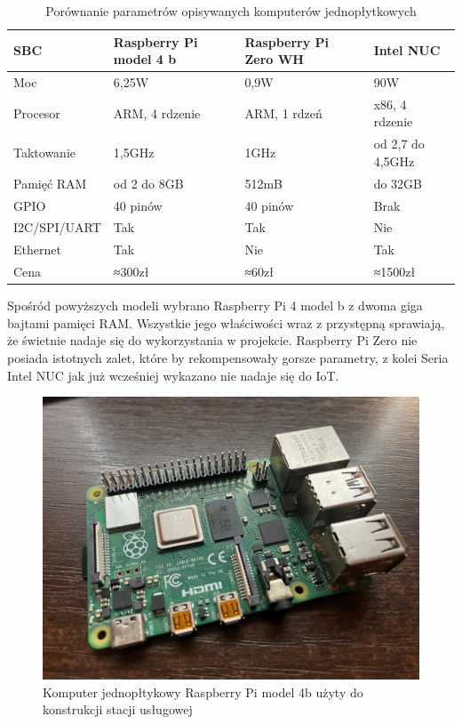 \documentclass[12pt, twoside, openany]{mwrep}
\begin{document}
\begin{table}[H]
\centering
\begin{tabular}{|l|l|l|l|}
\hline
SBC          & Raspberry Pi model 4 b & Raspberry Pi Zero WH & Intel NUC        \\ \hline
Moc          & 6,25W                  & 0,9W                 & 90W              \\ \hline
Procesor     & ARM, 4 rdzenie         & ARM, 1 rdzeń         & x86, 4 rdzenie   \\ \hline
Taktowanie   & 1,5GHz                 & 1GHz                 & od 2,7 do 4,5GHz \\ \hline
Pamięć RAM   & od 2 do 8GB            & 512mB                & do 32GB          \\ \hline
GPIO         & 40 pinów               & 40 pinów             & Brak             \\ \hline
I2C/SPI/UART & Tak                    & Tak                  & Nie              \\ \hline
Ethernet     & Tak                    & Nie                  & Tak              \\ \hline
Cena         & ≈300zł                 & ≈60zł                & ≈1500zł          \\ \hline
\end{tabular}
\caption{Porównanie parametrów opisywanych komputerów jednopłytkowych}
\end{table}
\par
Spośród powyższych modeli wybrano Raspberry Pi 4 model b z dwoma giga bajtami pamięci RAM. Wszystkie jego właściwości wraz z przystępną sprawiają, że świetnie nadaje się do wykorzystania w projekcie. Raspberry Pi Zero nie posiada istotnych zalet, które by rekompensowały gorsze parametry, z kolei Seria Intel NUC jak już wcześniej wykazano nie nadaje się do IoT.
\begin{figure}[H]
\centering
\includegraphics[scale=0.12]{rpi}
\caption{Komputer jednopłtykowy Raspberry Pi model 4b użyty do konstrukcji stacji usługowej}
\end{figure}
\end{document}
